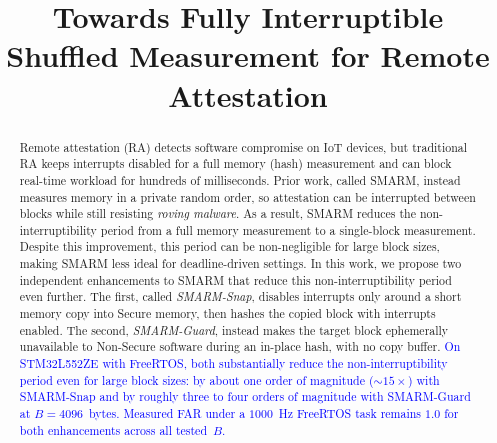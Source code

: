 \documentclass[conference]{IEEEtran}
\newcommand{\smarmcopy}{SMARM-Snap\xspace}
\newcommand{\smarmlock}{SMARM-Guard\xspace}
\newcommand\ben[1]{\textcolor{blue}{#1}}
\begin{document}
\title{Towards Fully Interruptible Shuffled Measurement for Remote Attestation}

\author{
}

\maketitle


\begin{abstract}
Remote attestation (RA) detects software compromise on IoT devices, but
traditional RA keeps interrupts disabled for a full memory (hash) measurement and can block real-time workload for hundreds of milliseconds.
Prior work, called SMARM, instead measures memory in a private random order, so attestation can be interrupted between blocks while still resisting \emph{roving malware}.
As a result, SMARM reduces the non-interruptibility period from a full memory measurement to a single-block measurement.
Despite this improvement, this period can be non-negligible for large block sizes, making SMARM less ideal for deadline-driven settings.
In this work, we propose two independent enhancements to SMARM that reduce this non-interruptibility period even further.
The first, called \emph{\smarmcopy}, disables interrupts only around a short memory copy into Secure memory, then hashes the copied block with interrupts enabled.
The second, \emph{\smarmlock}, instead makes the target block ephemerally unavailable to Non-Secure software during an in-place hash, with no copy buffer.
\ben{On STM32L552ZE with FreeRTOS, both substantially reduce the non-interruptibility period even for large block sizes: by about one order of magnitude ($\sim\!\!15\times$) with \smarmcopy{} and by roughly three to four orders of magnitude with \smarmlock{} at $B{=}4096$~bytes. Measured FAR under a $1000$~Hz FreeRTOS task remains $1.0$ for both enhancements across all tested~$B$.}
\end{abstract}
\end{document}
